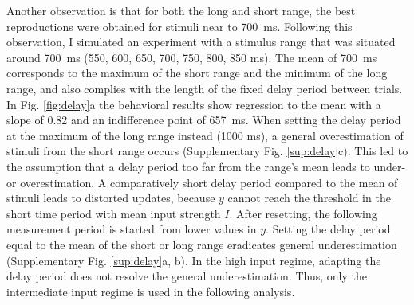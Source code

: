 \documentclass[10pt]{article}
\begin{document}
Another observation is that for both the long and short range, the best reproductions were obtained for stimuli near to 700~ms.
Following this observation, I simulated an experiment with a stimulus range that was situated around 700~ms (550, 600, 650, 700, 750, 800, 850 ms). 
The mean of 700~ms corresponds to the maximum of the short range and the minimum of the long range, and also complies with the length of the fixed delay period between trials.
In Fig. \ref{fig:delay}a the behavioral results show regression to the mean with a slope of 0.82 and an indifference point of 657~ms.
When setting the delay period at the maximum of the long range instead (1000 ms), a general overestimation of stimuli from the short range occurs (Supplementary Fig. \ref{sup:delay}c).
This led to the assumption that a delay period too far from the range's mean leads to under- or overestimation. 
A comparatively short delay period compared to the mean of stimuli leads to distorted updates, because $y$ cannot reach the threshold in the short time period with mean input strength $I$. 
After resetting, the following measurement period is started from lower values in $y$. 
Setting the delay period equal to the mean of the short or long range 
eradicates general underestimation (Supplementary Fig. \ref{sup:delay}a, b).
In the high input regime, adapting the delay period does not resolve the general underestimation. Thus, only the intermediate input regime is used in the following analysis.
\end{document}
